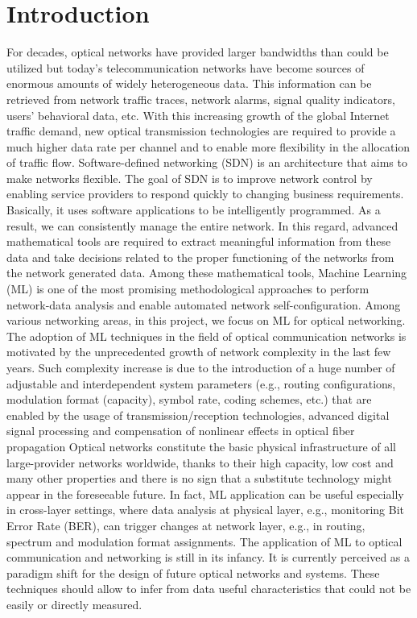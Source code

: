 \documentclass[letterpaper,titlepage,11pt]{article}
\begin{document}
\section{Introduction}
For decades, optical networks have provided larger bandwidths than could be utilized but today's telecommunication networks have become sources of enormous amounts of widely heterogeneous data. This information can be retrieved from network traffic traces, network alarms, signal quality indicators, users' behavioral data, etc. With this increasing growth of the global Internet traffic demand, new optical transmission technologies are required to provide a much higher data rate per channel and to enable more flexibility in the allocation of traffic flow. Software-defined networking (SDN) is an architecture that aims to make networks flexible. The goal of SDN is to improve network control by enabling service providers to respond quickly to changing business requirements. Basically, it uses software applications to be intelligently programmed. As a result, we can consistently manage the entire network. In this regard, advanced mathematical tools are required to extract meaningful information from these data and take decisions related to the proper functioning of the networks from the network generated data. Among these mathematical tools, Machine Learning (ML) is one of the most promising methodological approaches to perform network-data analysis and enable automated network self-configuration. Among various networking areas, in this project, we focus on ML for optical networking. The adoption of ML techniques in the field of optical communication networks is motivated by the unprecedented growth of network complexity in the last few years. Such complexity increase is due to the introduction of a huge number of adjustable and interdependent system parameters (e.g., routing configurations, modulation format (capacity), symbol rate, coding schemes, etc.) that are enabled by the usage of transmission/reception technologies, advanced digital signal processing and compensation of nonlinear effects in optical fiber propagation
Optical networks constitute the basic physical infrastructure of all large-provider networks worldwide, thanks to their high capacity, low cost and many other properties and there is no sign that a substitute technology might appear in the foreseeable future. In fact, ML application can be useful especially in cross-layer settings, where data analysis at physical layer, e.g., monitoring Bit Error Rate (BER), can trigger changes at network layer, e.g., in routing, spectrum and modulation format assignments. The application of ML to optical communication and networking is still in its infancy. It is currently perceived as a paradigm shift for the design of future optical networks and systems. These techniques should allow to infer from data useful characteristics that could not be easily or directly measured.
\end{document}
